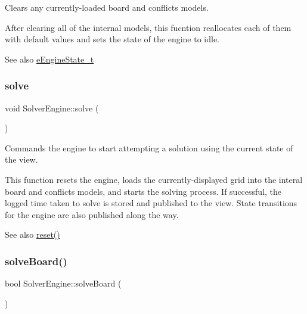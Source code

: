 Clears any currently-\/loaded board and conflicts models. 

After clearing all of the internal models, this fucntion reallocates each of them with default values and sets the state of the engine to idle. \begin{DoxySeeAlso}{See also}
\mbox{\hyperlink{class_solver_engine_acd25f3521e492d4aa924f922396bf02c}{e\+Engine\+State\+\_\+t}} 
\end{DoxySeeAlso}
\mbox{\label{class_solver_engine_a819bfa5cf96fc7fe05e9f091bf2666e2}} 
\subsubsection{\texorpdfstring{solve}{solve}}
{\footnotesize\ttfamily void Solver\+Engine\+::solve (\begin{DoxyParamCaption}{ }\end{DoxyParamCaption})\hspace{0.3cm}{\ttfamily [slot]}}



Commands the engine to start attempting a solution using the current state of the view. 

This function resets the engine, loads the currently-\/displayed grid into the interal board and conflicts models, and starts the solving process. If successful, the logged time taken to solve is stored and published to the view. State transitions for the engine are also published along the way. \begin{DoxySeeAlso}{See also}
\mbox{\hyperlink{class_solver_engine_af8e6ec12a994e8a463f2b3b1a0368e33}{reset()}} 
\end{DoxySeeAlso}
\mbox{\label{class_solver_engine_a8c1f32f617ef8c5b83c4bef56e7dc89a}} 
\subsubsection{\texorpdfstring{solve\+Board()}{solveBoard()}}
{\footnotesize\ttfamily bool Solver\+Engine\+::solve\+Board (\begin{DoxyParamCaption}{ }\end{DoxyParamCaption})\hspace{0.3cm}{\ttfamily [private]}}



